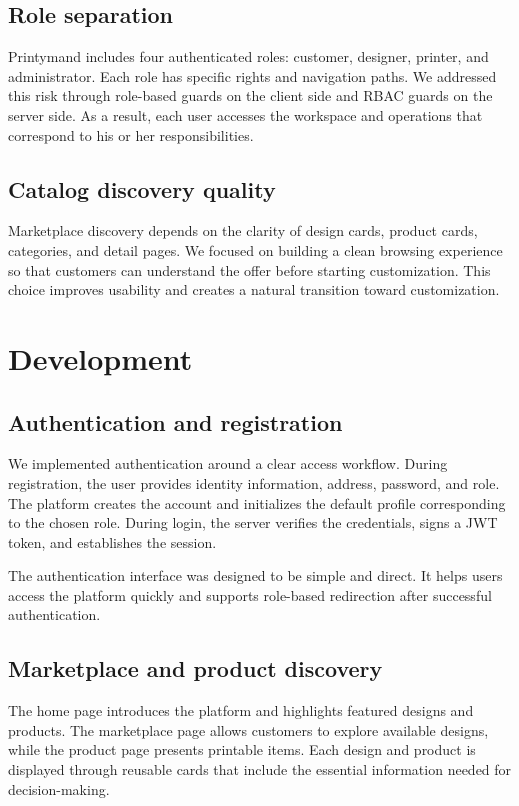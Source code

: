 \subsection{Role separation}
Printymand includes four authenticated roles: customer, designer, printer, and administrator.
Each role has specific rights and navigation paths.
We addressed this risk through role-based guards on the client side and RBAC guards on the server side.
As a result, each user accesses the workspace and operations that correspond to his or her responsibilities.

\subsection{Catalog discovery quality}
Marketplace discovery depends on the clarity of design cards, product cards, categories, and detail pages.
We focused on building a clean browsing experience so that customers can understand the offer before starting customization.
This choice improves usability and creates a natural transition toward customization.

\section{Development}
\subsection{Authentication and registration}
We implemented authentication around a clear access workflow.
During registration, the user provides identity information, address, password, and role.
The platform creates the account and initializes the default profile corresponding to the chosen role.
During login, the server verifies the credentials, signs a JWT token, and establishes the session.

The authentication interface was designed to be simple and direct.
It helps users access the platform quickly and supports role-based redirection after successful authentication.


\subsection{Marketplace and product discovery}
The home page introduces the platform and highlights featured designs and products.
The marketplace page allows customers to explore available designs, while the product page presents printable items.
Each design and product is displayed through reusable cards that include the essential information needed for decision-making.

